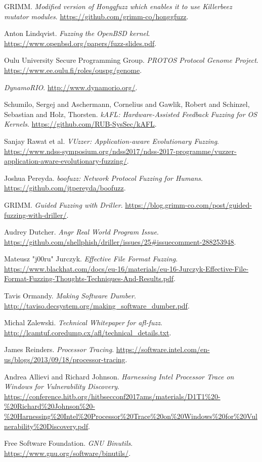 \begin{thebibliography}{99}
  GRIMM.
  \textit{Modified version of Honggfuzz which enables it to use Killerbeez mutator modules}.
  \url{https://github.com/grimm-co/honggfuzz}.

  Anton Lindqvist.
  \textit{Fuzzing the OpenBSD kernel}.
  \url{https://www.openbsd.org/papers/fuzz-slides.pdf}.

  Oulu University Secure Programming Group.
  \textit{PROTOS Protocol Genome Project}.
  \url{https://www.ee.oulu.fi/roles/ouspg/genome}.

  \textit{DynamoRIO}.
  \url{http://www.dynamorio.org/}.

  Schumilo, Sergej and Aschermann, Cornelius and Gawlik, Robert and Schinzel, Sebastian and Holz, Thorsten.
  \textit{kAFL: Hardware-Assisted Feedback Fuzzing for OS Kernels}.
  \url{https://github.com/RUB-SysSec/kAFL}.

  Sanjay Rawat et al.
  \textit{VUzzer: Application-aware Evolutionary Fuzzing}.
  \url{https://www.ndss-symposium.org/ndss2017/ndss-2017-programme/vuzzer-application-aware-evolutionary-fuzzing/}.

  Joshua Pereyda.
  \textit{boofuzz: Network Protocol Fuzzing for Humans}.
  \url{https://github.com/jtpereyda/boofuzz}.

  GRIMM.
  \textit{Guided Fuzzing with Driller}.
  \url{https://blog.grimm-co.com/post/guided-fuzzing-with-driller/}.

  Audrey Dutcher.
  \textit{Angr Real World Program Issue}.
  \url{https://github.com/shellphish/driller/issues/25#issuecomment-288253948}.

  Mateusz "j00ru" Jurczyk.
  \textit{Effective File Format Fuzzing}.
  \url{https://www.blackhat.com/docs/eu-16/materials/eu-16-Jurczyk-Effective-File-Format-Fuzzing-Thoughts-Techniques-And-Results.pdf}.

  Tavis Ormandy.
  \textit{Making Software Dumber}.
  \url{http://taviso.decsystem.org/making_software_dumber.pdf}.

  Michal Zalewski.
  \textit{Technical Whitepaper for afl-fuzz}.
  \url{http://lcamtuf.coredump.cx/afl/technical_details.txt}.

  James Reinders.
  \textit{Processor Tracing}.
  \url{https://software.intel.com/en-us/blogs/2013/09/18/processor-tracing}.

  Andrea Allievi and Richard Johnson.
  \textit{Harnessing Intel Processor Trace on Windows for Vulnerability Discovery}.
  \url{https://conference.hitb.org/hitbsecconf2017ams/materials/D1T1%20-%20Richard%20Johnson%20-%20Harnessing%20Intel%20Processor%20Trace%20on%20Windows%20for%20Vulnerability%20Discovery.pdf}.

  Free Software Foundation.
  \textit{GNU Binutils}.
  \url{https://www.gnu.org/software/binutils/}.


\end{thebibliography}

